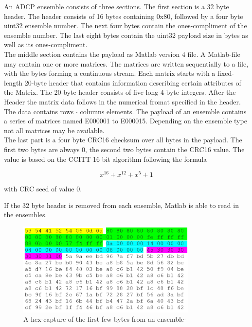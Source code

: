 An ADCP ensemble consists of three sections. The first section is a 32 byte header. The header consists of 16 bytes containing 0x80, followed by a four byte uint32 ensemble number. The next four bytes contain the ones-compliment of the ensemble number. The last eight bytes contain the uint32 payload size in bytes as well as its ones-compliment.\\
The middle section contains the payload as Matlab version 4 file. A Matlab-file may contain one or more matrices. The matrices are written sequentially to a file, with the bytes forming a continuous stream. Each matrix starts with a fixed-length 20-byte header that contains information describing certain attributes of the Matrix. The 20-byte header consists of five long 4-byte integers. After the Header the matrix data follows in the numerical fromat specified in the header. The data contains rows $\cdot$ columns elements.
The payload of an ensemble contains a series of matrices named E000001 to E000015. Depending on the ensemble type not all matrices may be available.\\
The last part is a four byte CRC16 checksum over all bytes in the payload. The first two bytes are always 0, the second two bytes contain the CRC16 value. The value is based on the CCITT 16 bit algorithm following the formula 

$$ x^{16} + x^{12} + x^5 +1$$

with CRC seed of value 0.

If the 32 byte header is removed from each ensemble, Matlab is able to read in the ensembles.
\begin{figure}[h]
\centering
      \includegraphics[width=0.8\textwidth]{hexdump}
        \caption{A hex-capture of the first few bytes from an ensemble- }
\end{figure}

